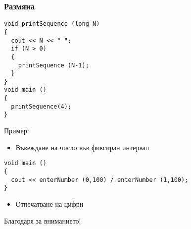 \documentclass{beamer}
\begin{document}
\begin{frame}[fragile]
\frametitle{Размяна}



\begin{lstlisting}
void printSequence (long N)
{
  cout << N << " ";
  if (N > 0)
  {
    printSequence (N-1);
  }
}
void main ()
{
  printSequence(4);
}
\end{lstlisting}
\end{frame}


\begin{frame}[fragile]
\centerline{Пример:}
\begin{itemize}
  \item Въвеждане на число във фиксиран интервал
\end{itemize}

\begin{flushleft}
\begin{lstlisting}
void main ()
{
  cout << enterNumber (0,100) / enterNumber (1,100);
}
\end{lstlisting}
  
\end{flushleft}

\begin{itemize}
  \item Отпечатване на цифри
\end{itemize}


\end{frame}



\begin{frame}
\centerline{Благодаря за вниманието!}
\end{frame}
\end{document}
